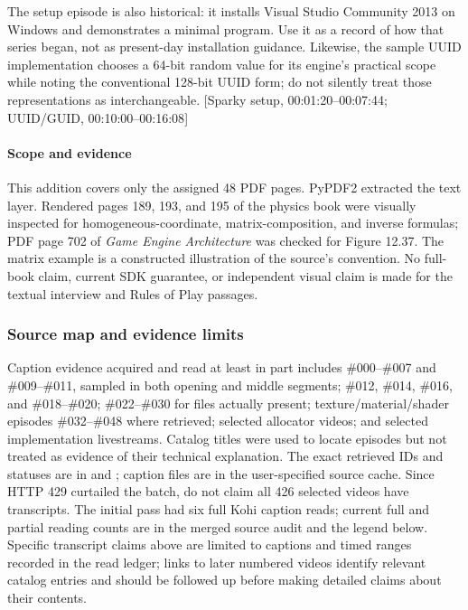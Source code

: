 The setup episode is also historical: it installs Visual Studio Community 2013 on Windows and demonstrates a minimal program. Use it as a record of how that series began, not as present-day installation guidance. Likewise, the sample UUID implementation chooses a 64-bit random value for its engine's practical scope while noting the conventional 128-bit UUID form; do not silently treat those representations as interchangeable. {[}Sparky setup, 00:01:20--00:07:44; UUID/GUID, 00:10:00--00:16:08{]}

\paragraph{Scope and evidence}\label{06-engine-ii-ch042-scope-and-evidence}

\hypertarget{06-engine-ii-ch042-scope-and-evidence}{}

This addition covers only the assigned 48 PDF pages. PyPDF2 extracted the text layer. Rendered pages 189, 193, and 195 of the physics book were visually inspected for homogeneous-coordinate, matrix-composition, and inverse formulas; PDF page 702 of \emph{Game Engine Architecture} was checked for Figure 12.37. The matrix example is a constructed illustration of the source's convention. No full-book claim, current SDK guarantee, or independent visual claim is made for the textual interview and Rules of Play passages.

\subsubsection{Source map and evidence limits}\label{06-engine-ii-ch042-source-map-and-evidence-limits}

\hypertarget{06-engine-ii-ch042-source-map-and-evidence-limits}{}

Caption evidence acquired and read at least in part includes \#000--\#007 and \#009--\#011, sampled in both opening and middle segments; \#012, \#014, \#016, and \#018--\#020; \#022--\#030 for files actually present; texture/material/shader episodes \#032--\#048 where retrieved; selected allocator videos; and selected implementation livestreams. Catalog titles were used to locate episodes but not treated as evidence of their technical explanation. The exact retrieved IDs and statuses are in  and ; caption files are in the user-specified source cache. Since HTTP 429 curtailed the batch, do not claim all 426 selected videos have transcripts. The initial pass had six full Kohi caption reads; current full and partial reading counts are in the merged source audit and the legend below. Specific transcript claims above are limited to captions and timed ranges recorded in the read ledger; links to later numbered videos identify relevant catalog entries and should be followed up before making detailed claims about their contents.

